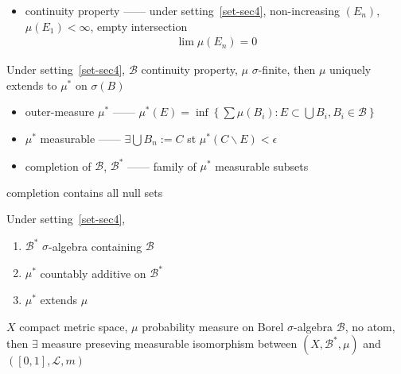\begin{itemize}
    \item continuity property ------ under setting~\ref{set-sec4}, non-increasing $(E_n)$, $\mu(E_1) < \infty$, empty intersection
    \begin{align*}
        \lim \mu(E_n) = 0
    \end{align*}
\end{itemize}

\begin{thm}
    Under setting~\ref{set-sec4}, $\mathcal{B}$ continuity property, $\mu$ $\sigma$-finite, then
    $\mu$ uniquely extends to $\mu^*$ on $\sigma(B)$
\end{thm}

\begin{itemize}
    \item outer-measure $\mu^*$ ------ $\mu^*(E) = \inf \left\{ \sum \mu(B_i) : E \subset \bigcup B_i, B_i \in \mathcal{B} \right\}$
    \item $\mu^*$ measurable ------ $\exists \bigcup B_n := C$ st $\mu^*(C \backslash E) < \epsilon$
    \item completion of $\mathcal{B}$, $\mathcal{B^*}$ ------ family of $\mu^*$ measurable subsets
\end{itemize}

\begin{fact}
    completion contains all null sets
\end{fact}

\begin{prop}
    Under setting~\ref{set-sec4},
    \begin{enumerate}
        \item $\mathcal{B}^*$ $\sigma$-algebra containing $\mathcal{B}$
        \item $\mu^*$ countably additive on $\mathcal{B}^*$
        \item $\mu^*$ extends $\mu$
    \end{enumerate}
\end{prop}

\begin{myth}
    $X$ compact metric space, $\mu$ probability measure on Borel $\sigma$-algebra $\mathcal{B}$, no atom, then $\exists$
    measure preseving measurable isomorphism between $(X, \mathcal{B^*}, \mu)$ and $([0,1], \mathcal{L}, m)$
\end{myth}